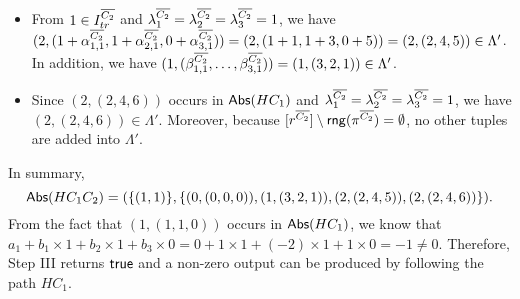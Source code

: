 \begin{example}
\begin{itemize}
\item From $1 \in I^{\overline{C_2}}_{tr}$ and $\lambda^{\overline{C_2}}_1 = \lambda^{\overline{C_2}}_2 = \lambda^{\overline{C_2}}_3 = 1$, we have $(2, (1 + \alpha^{\overline{C_2}}_{1, 1}, 1+\alpha^{\overline{C_2}}_{2, 1}, 0 + \alpha^{\overline{C_2}}_{3, 1})) = (2, (1+1, 1+3, 0 +5))= (2, (2, 4, 5)) \in \Lambda'$. In addition, we have $(1, (\beta^{\overline{C_2}}_{1, 1}, \dots, \beta^{\overline{C_2}}_{3, 1}))=(1, (3, 2, 1)) \in \Lambda'$.

\item Since $(2, (2, 4, 6))$ occurs in $\mathsf{Abs}(HC_1)$ and $\lambda^{\overline{C_2}}_1 = \lambda^{\overline{C_2}}_2 = \lambda^{\overline{C_2}}_3 = 1$, we have $(2, (2, 4, 6)) \in \Lambda'$. Moreover, because $[r^{\overline{C_2}}] \setminus \mathsf{rng}(\pi^{\overline{C_2}})=\emptyset$, no other tuples are added into $\Lambda'$.
\end{itemize}
In summary, 
$$\mathsf{Abs}(HC_1C_2)=(\{(1,1)\}, \{(0,(0,0,0)), (1, (3,2,1)), (2, (2,4,5)), (2, (2, 4,6))\}).$$
From the fact that $(1, (1, 1, 0))$ occurs in $\mathsf{Abs}(HC_1)$, we know that $a_1 + b_1 \times 1 + b_2 \times 1 + b_3 \times 0 = 0 + 1 \times 1 + (-2) \times 1 + 1 \times 0 = -1 \neq 0$. Therefore, Step III returns $\mathsf{true}$ and a non-zero output can be produced by following the path $HC_1$.
\end{example}
